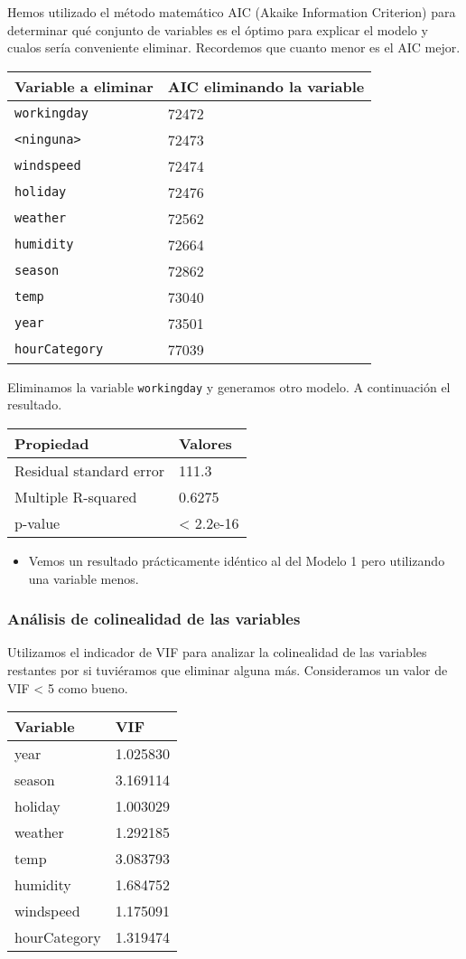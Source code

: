 \documentclass[
]{article}
\providecommand{\tightlist}{%
  \setlength{\itemsep}{0pt}\setlength{\parskip}{0pt}}
\begin{document}
Hemos utilizado el método matemático AIC (Akaike Information Criterion)
para determinar qué conjunto de variables es el óptimo para explicar el
modelo y cualos sería conveniente eliminar. Recordemos que cuanto menor
es el AIC mejor.

\begin{longtable}[]{@{}ll@{}}
\toprule
Variable a eliminar & AIC eliminando la variable\tabularnewline
\midrule
\endhead
\texttt{workingday} & 72472\tabularnewline
\texttt{\textless{}ninguna\textgreater{}} & 72473\tabularnewline
\texttt{windspeed} & 72474\tabularnewline
\texttt{holiday} & 72476\tabularnewline
\texttt{weather} & 72562\tabularnewline
\texttt{humidity} & 72664\tabularnewline
\texttt{season} & 72862\tabularnewline
\texttt{temp} & 73040\tabularnewline
\texttt{year} & 73501\tabularnewline
\texttt{hourCategory} & 77039\tabularnewline
\bottomrule
\end{longtable}

Eliminamos la variable \texttt{workingday} y generamos otro modelo. A
continuación el resultado.

\begin{longtable}[]{@{}ll@{}}
\toprule
Propiedad & Valores\tabularnewline
\midrule
\endhead
Residual standard error & 111.3\tabularnewline
Multiple R-squared & 0.6275\tabularnewline
p-value & \textless{} 2.2e-16\tabularnewline
\bottomrule
\end{longtable}

\begin{itemize}
\tightlist
\item
  Vemos un resultado prácticamente idéntico al del Modelo 1 pero
  utilizando una variable menos.
\end{itemize}

\hypertarget{anuxe1lisis-de-colinealidad-de-las-variables}{%
\subsubsection{Análisis de colinealidad de las
variables}\label{anuxe1lisis-de-colinealidad-de-las-variables}}

Utilizamos el indicador de VIF para analizar la colinealidad de las
variables restantes por si tuviéramos que eliminar alguna más.
Consideramos un valor de VIF \textless{} 5 como bueno.

\begin{longtable}[]{@{}ll@{}}
\toprule
Variable & VIF\tabularnewline
\midrule
\endhead
year & 1.025830\tabularnewline
season & 3.169114\tabularnewline
holiday & 1.003029\tabularnewline
weather & 1.292185\tabularnewline
temp & 3.083793\tabularnewline
humidity & 1.684752\tabularnewline
windspeed & 1.175091\tabularnewline
hourCategory & 1.319474\tabularnewline
\bottomrule
\end{longtable}
\end{document}
